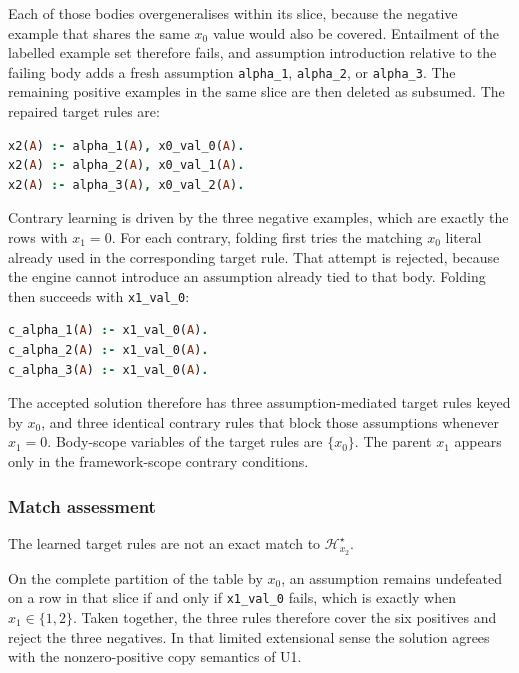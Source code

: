 \documentclass[11pt]{article}
\begin{document}
Each of those bodies overgeneralises within its slice, because the negative example that shares the same \(x_0\) value would also be covered. Entailment of the labelled example set therefore fails, and assumption introduction relative to the failing body adds a fresh assumption \texttt{alpha\_1}, \texttt{alpha\_2}, or \texttt{alpha\_3}. The remaining positive examples in the same slice are then deleted as subsumed. The repaired target rules are:

\begin{lstlisting}[style=logic,language=Prolog]
x2(A) :- alpha_1(A), x0_val_0(A).
x2(A) :- alpha_2(A), x0_val_1(A).
x2(A) :- alpha_3(A), x0_val_2(A).
\end{lstlisting}

Contrary learning is driven by the three negative examples, which are exactly the rows with \(x_1=0\). For each contrary, folding first tries the matching \(x_0\) literal already used in the corresponding target rule. That attempt is rejected, because the engine cannot introduce an assumption already tied to that body. Folding then succeeds with \texttt{x1\_val\_0}:

\begin{lstlisting}[style=logic,language=Prolog]
c_alpha_1(A) :- x1_val_0(A).
c_alpha_2(A) :- x1_val_0(A).
c_alpha_3(A) :- x1_val_0(A).
\end{lstlisting}

The accepted solution therefore has three assumption-mediated target rules keyed by \(x_0\), and three identical contrary rules that block those assumptions whenever \(x_1=0\). Body-scope variables of the target rules are \(\{x_0\}\). The parent \(x_1\) appears only in the framework-scope contrary conditions.

\subsubsection{Match assessment}

The learned target rules are not an exact match to \(\mathcal{H}_{x_2}^\star\).

On the complete partition of the table by \(x_0\), an assumption remains undefeated on a row in that slice if and only if \texttt{x1\_val\_0} fails, which is exactly when \(x_1\in\{1,2\}\). Taken together, the three rules therefore cover the six positives and reject the three negatives. In that limited extensional sense the solution agrees with the nonzero-positive copy semantics of U1.
\end{document}
